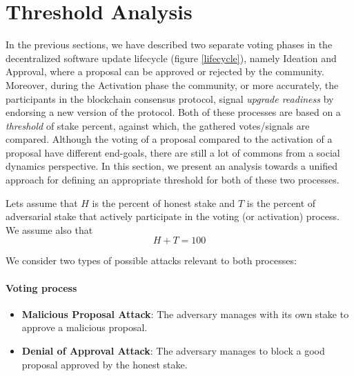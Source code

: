 \section{Threshold Analysis}

In the previous sections, we have described two separate voting phases in the 
decentralized software update lifecycle (figure \ref{lifecycle}), namely 
Ideation and Approval, where a proposal can be approved or rejected by the 
community. Moreover, during the Activation phase the community, or more 
accurately, the participants in the blockchain consensus protocol, signal 
\emph{upgrade readiness} by endorsing a new version of the protocol. Both of 
these processes are based on a \emph{threshold} of stake percent, against 
which, 
the gathered votes/signals are compared. Although the voting of a proposal 
compared to the activation of a proposal have different end-goals, there 
are still a lot of commons from a social dynamics perspective. In this section, 
we present an analysis towards a unified approach for defining an appropriate 
threshold for both of these two processes.

Lets assume that $H$ is the percent of honest stake and $T$ is the percent of 
adversarial stake that actively participate in the voting (or activation) 
process. We assume 
also that
\begin{equation}\label{eq:H_plus_T}
	H+T=100    
\end{equation}

We consider two types of possible attacks relevant to both processes:
\paragraph{Voting process}
\begin{itemize}
	\item \textbf{Malicious Proposal Attack}: The 
	adversary manages with its own stake to approve a malicious proposal.
	\item \textbf{Denial of Approval Attack}: The adversary manages to block a 
	good 
	proposal approved by the honest stake.
\end{itemize}

